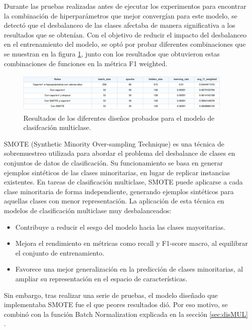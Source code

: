 Durante las pruebas realizadas antes de ejecutar los experimentos para encontrar la combinación de hiperparámetros que mejor convergían para este modelo, se detectó que el desbalanceo de las clases afectaba de manera significativa a los resultados que se obtenían. Con el objetivo de reducir el impacto del desbalanceo en el entrenamiento del modelo, se optó por probar diferentes combinaciones que se muestran en la figura \ref{fig:MULpruebas}, junto con los resultados que obtuvieron estas combinaciones de funciones en la métrica F1 weighted.


\begin{figure}[H]
    \centering
    \includegraphics[width=0.95\textwidth]{./img/modelo/MULPRUEBAS.pdf}
    \caption{Resultados de los diferentes diseños probados para el modelo de clasifcación multiclase.}
    \label{fig:MULpruebas}
\end{figure}

SMOTE (Synthetic Minority Over-sampling Technique) es una técnica de sobremuestreo utilizada para abordar el problema del desbalance de clases en conjuntos de datos de clasificación. Su funcionamiento se basa en generar ejemplos sintéticos de las clases minoritarias, en lugar de replicar instancias existentes. En tareas de clasificación multiclase, SMOTE puede aplicarse a cada clase minoritaria de forma independiente, generando ejemplos sintéticos para aquellas clases con menor representación. La aplicación de esta técnica en modelos de clasificación multiclase muy desbalanceados:

\begin{itemize}
	\item Contribuye a reducir el sesgo del modelo hacia las clases mayoritarias.

	\item Mejora el rendimiento en métricas como recall y F1-score macro, al equilibrar el conjunto de entrenamiento.

	\item Favorece una mejor generalización en la predicción de clases minoritarias, al ampliar su representación en el espacio de características.
\end{itemize}

Sin embargo, tras realizar una serie de pruebas, el modelo diseñado que implementaba  SMOTE fue el que peores resultados dió. Por eso motivo, se combinó con la función Batch Normalization explicada en la sección \ref{sec:disMUL} .

